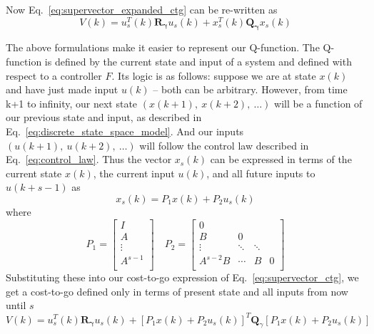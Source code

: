 Now Eq.~\ref{eq:supervector_expanded_ctg} can be re-written as
\begin{equation}
    V\left(k\right)=u_s^T\left(k\right)\textbf{R}_\mathbf{\gamma}u_s\left(k\right)+x_s^T\left(k\right)\textbf{Q}_\mathbf{\gamma}{x}_{s}\left({k}\right)
    \label{eq:supervector_ctg}
\end{equation}

The above formulations make it easier to represent our Q-function. The Q-function is defined by the current state and input of a system and defined with respect to a controller $F$. Its logic is as follows: suppose we are at state $x\left(k\right)$ and have just made input $u\left(k\right)$ -- both can be arbitrary. However, from time k+1 to infinity, our next state $(x(k+1),\ x(k+2),\ \ldots)$ will be a function of our previous state and input, as described in Eq.~\ref{eq:discrete_state_space_model}. And our inputs $(u(k+1),\ u(k+2),\ \ldots)$ will follow the control law described in Eq.~\ref{eq:control_law}. Thus the vector $x_s\left(k\right)$ can be expressed in terms of the current state $x\left(k\right)$, the current input $u\left(k\right)$, and all future inputs to $u\left(k+s-1\right)$ as
\begin{equation}
    x_s\left(k\right)=P_1x\left(k\right)+P_2u_s\left(k\right)
    \label{eq:xs}
\end{equation}
where
\begin{equation}
    P_1=\left[\begin{matrix}I\\A\\\vdots\\A^{s-1}\\\end{matrix}\right]	
    \quad
    P_2=\left[\begin{matrix}0&&&\\B&0&&\\\vdots&\ddots&\ddots&\\A^{s-2}B&\cdots&B&0\\\end{matrix}\right]
    \label{eq:P1_P2}
\end{equation}
Substituting these into our cost-to-go expression of Eq.~\ref{eq:supervector_ctg}, we get a cost-to-go defined only in terms of present state and all inputs from now until $s$
\begin{equation}
    V\left(k\right)=u_s^T\left(k\right)\mathbf{R}_\mathbf{\gamma}u_s\left(k\right)+{\left[P_1x\left(k\right)+P_2u_s\left(k\right)\right]}^T\textbf{Q}_\gamma\left[P_1x\left(k\right)+P_2u_s\left(k\right)\right]
\end{equation}

